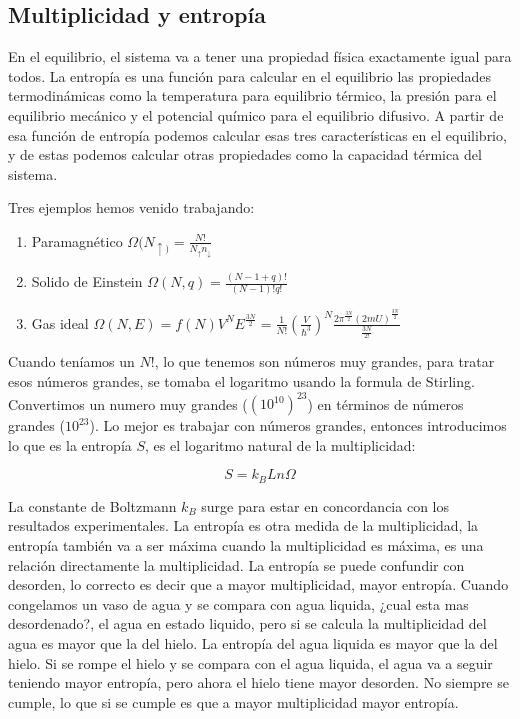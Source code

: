 \documentclass[11pt,fleqn]{book}
\begin{document}
\subsection{Multiplicidad y entropía}

En el equilibrio, el sistema va a tener una propiedad física exactamente igual para todos. La entropía es una función para calcular en el equilibrio las propiedades termodinámicas como la temperatura para  equilibrio térmico, la presión para el equilibrio mecánico y el potencial químico para el equilibrio difusivo. A partir de esa función de entropía podemos calcular esas tres características en el equilibrio, y de estas podemos calcular otras propiedades como la capacidad térmica del sistema. 

Tres ejemplos hemos venido trabajando:

\begin{enumerate}
    \item Paramagnético $\Omega(N_{\uparrow)}=\frac{N!}{N_{\uparrow}n_{\downarrow}}$
    \item Solido de Einstein $\Omega(N,q)=\frac{(N-1+q)!}{(N-1)!q!}$
    \item Gas ideal $\Omega(N,E)=f(N)V^{N}E^{\frac{3N}{2}}=\frac{1}{N !}\left(\frac{V}{\hslash^{3}}\right)^{N} \frac{2 \pi^{\frac{3 N}{2}}(2 m U)^{\frac{3N }{2}}}{\frac{3 N}{2 !}}$
\end{enumerate}

Cuando teníamos un $N!$, lo que tenemos son números muy grandes, para tratar esos números grandes, se tomaba el logaritmo usando la formula de Stirling. Convertimos un numero muy grandes ($(10^{10})^{23}$) en términos de números grandes ($10^{23}$). Lo mejor es trabajar con números grandes, entonces introducimos lo que es la entropía $S$, es el logaritmo natural de la multiplicidad:

\begin{equation}
    S=k_{B}Ln\Omega
    \label{Eq. 3.13}
\end{equation}

La constante de Boltzmann $k_{B}$ surge para estar en concordancia con los resultados experimentales.  La entropía es otra medida de la multiplicidad, la entropía también va a ser máxima cuando la multiplicidad es máxima, es una relación directamente la multiplicidad. La entropía se puede confundir con desorden, lo correcto es decir que a mayor multiplicidad, mayor entropía. Cuando congelamos un vaso de agua y se compara con agua liquida, ¿cual esta mas desordenado?, el agua en estado liquido, pero si se calcula la multiplicidad del agua es mayor que la del hielo. La entropía del agua liquida es mayor que la del hielo. Si se rompe el hielo y se compara con el agua liquida, el agua va a seguir teniendo mayor entropía, pero ahora el hielo tiene mayor desorden. No siempre se cumple, lo que si se cumple es que a mayor multiplicidad mayor entropía.
\end{document}
